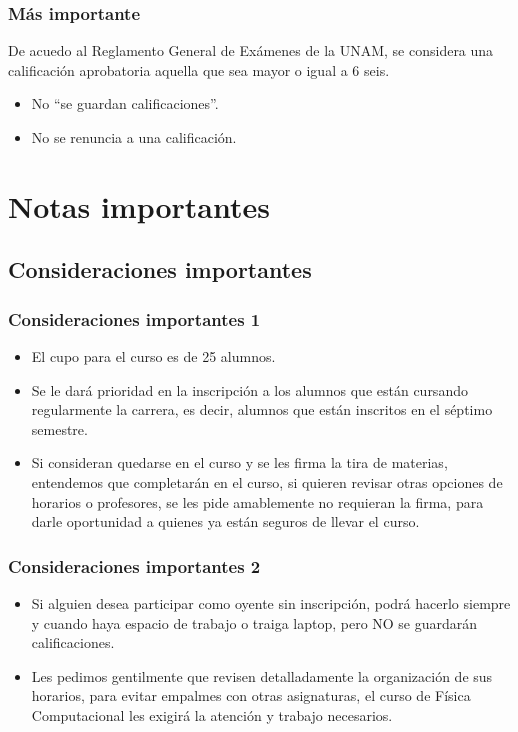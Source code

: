 \begin{frame}
\frametitle{Más importante}
De acuedo al Reglamento General de Exámenes de la UNAM, se considera una calificación aprobatoria aquella que sea mayor o igual a $6$ seis.
\\
\medskip
\begin{itemize}
\item No \enquote{se guardan calificaciones}.
\item No se renuncia a una calificación.
\end{itemize}
\end{frame}
\section{Notas importantes}
\subsection{Consideraciones importantes}
\begin{frame}
\frametitle{Consideraciones importantes 1}
\begin{itemize}[<+->]
\item El cupo para el curso es de 25 alumnos.
\item Se le dará prioridad en la inscripción a los alumnos que están cursando regularmente la carrera, es decir, alumnos que están inscritos en el séptimo semestre.
\item Si consideran quedarse en el curso y se les firma la tira de materias, entendemos que completarán en el curso, si quieren revisar otras opciones de horarios o profesores, se les pide amablemente no requieran la firma, para darle oportunidad a quienes ya están seguros de llevar el curso.
\end{itemize}
\end{frame}
\begin{frame}
\frametitle{Consideraciones importantes 2}
\begin{itemize}[<+->]
\item Si alguien desea participar como oyente sin inscripción, podrá hacerlo siempre y cuando haya espacio de trabajo o traiga laptop, pero NO se guardarán calificaciones.
\item Les pedimos gentilmente que revisen detalladamente la organización de sus horarios, para evitar empalmes con otras asignaturas, el curso de Física Computacional les exigirá la atención y trabajo necesarios.
\end{itemize}
\end{frame}
